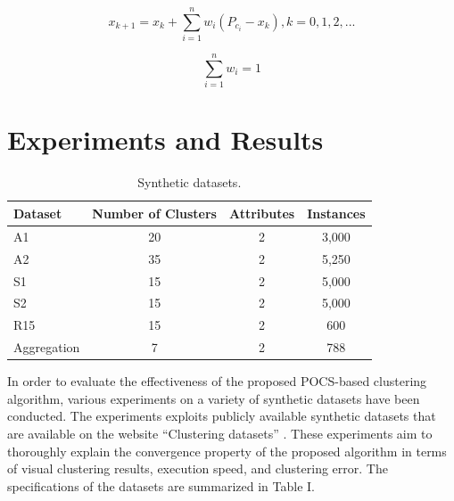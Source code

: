 \documentclass[conference]{IEEEtran}
\begin{document}
\begin{equation}
x_{k+1} = x_k + \sum_{i=1}^{n} w_i (P_{c_i} - x_k), k=0,1,2,... \label{eq12}
\end{equation}

\begin{equation}
\sum_{i=1}^{n} w_i = 1  \label{eq13}
\end{equation}


\section{Experiments and Results}

\begin{table}[t]
\caption{Synthetic datasets.}
\setlength\tabcolsep{0pt} %
\begin{tabular*}{\columnwidth}{@{\extracolsep{\fill}} lccc}

\toprule
     \textbf{Dataset} & \textbf{Number of Clusters} & \textbf{Attributes} & \textbf{Instances} \\

\midrule
     A1  & 20 & 2 & 3,000 \\
     A2  & 35 & 2 & 5,250 \\
     S1  & 15 & 2 & 5,000 \\
     S2  & 15 & 2 & 5,000 \\
     R15  & 15 & 2 & 600 \\
     Aggregation  & 7 & 2 & 788 \\
     
\bottomrule
\end{tabular*}
\end{table}

In order to evaluate the effectiveness of the proposed POCS-based clustering algorithm, various experiments on a variety of synthetic datasets have been conducted. The experiments exploits publicly available synthetic datasets that are available on the website “Clustering datasets” \cite{b8}. These experiments aim to thoroughly explain the convergence property of the proposed algorithm in terms of visual clustering results,
execution speed, and clustering error. The specifications of the datasets are summarized in Table I.
\end{document}
